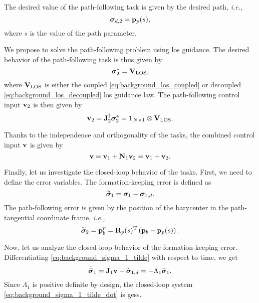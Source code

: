 The desired value of the path-following task is given by the desired path, \emph{i.e.,}
\begin{equation}
    \bm{\sigma}_{d, 2} = \mathbf{p}_p(s),
\end{equation}
where $s$ is the value of the path parameter.

We propose to solve the path-following problem using \acrlong{los} guidance.
The desired behavior of the path-following task is thus given by
\begin{equation}
    \bm{\sigma}_2^{*} = \mathbf{V}_{\rm LOS},
\end{equation}
where $\mathbf{V}_{\rm LOS}$ is either the coupled \eqref{eq:background_los_coupled} or decoupled \eqref{eq:background_los_decoupled} \gls{los} guidance law.
The path-following control input $\mathbf{v}_2$ is then given by
\begin{equation}
    \mathbf{v}_2 = \mathbf{J}_2^{\dagger} \bm{\sigma}_2^{*} = \mathbf{1}_{N \times 1} \otimes \mathbf{V}_{\rm LOS}.
\end{equation}

Thanks to the independence and orthogonality of the tasks, the combined control input $\mathbf{v}$ is given by
\begin{equation}
    \mathbf{v} = \mathbf{v}_1 + \mathbf{N}_1 \mathbf{v}_2 = \mathbf{v}_1 + \mathbf{v}_2.
\end{equation}

Finally, let us investigate the closed-loop behavior of the tasks.
First, we need to define the error variables.
The formation-keeping error is defined as
\begin{equation}
    \widetilde{\bm{\sigma}}_1 = \bm{\sigma}_1 - \bm{\sigma}_{1, d}.
    \label{eq:background_sigma_1_tilde}
\end{equation}
The path-following error is given by the position of the barycenter in the path-tangential coordinate frame, \emph{i.e.,}
\begin{equation}
    \widetilde{\bm{\sigma}}_2 = \mathbf{p}_b^p = \mathbf{R}_p(s)^{\mathrm{T}} \left(\mathbf{p}_b - \mathbf{p}_p(s)\right).
    \label{eq:background_sigma_2_tilde}
\end{equation}

Now, let us analyze the closed-loop behavior of the formation-keeping error.
Differentiating \eqref{eq:background_sigma_1_tilde} with respect to time, we get
\begin{equation}
    \dot{\widetilde{\bm{\sigma}}}_1 = \mathbf{J}_1 \mathbf{v} - \dot{\bm{\sigma}}_{1, d} = - \Lambda_1 \widetilde{\bm{\sigma}}_1.
    \label{eq:background_sigma_1_tilde_dot}
\end{equation}
Since $\Lambda_1$ is positive definite by design, the closed-loop system \eqref{eq:background_sigma_1_tilde_dot} is \glspl{ges}.

